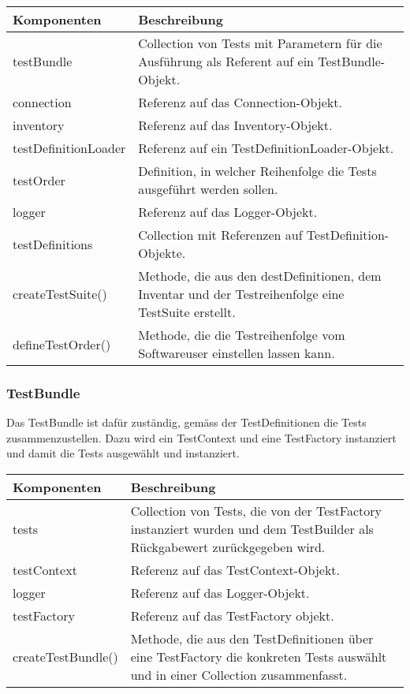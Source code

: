 \documentclass[
	ngerman,
	toc=listof, %
	toc=bibliography, %
	footnotes=multiple, %
	parskip=half, %
	numbers=noendperiod %
]{scrartcl}
\begin{document}
	\begin{tabularx}{\textwidth}{lX}
		\toprule
			Komponenten & Beschreibung \\
		\midrule
			testBundle & Collection von Tests mit Parametern für die Ausführung als Referent auf ein TestBundle-Objekt. \\
			connection & Referenz auf das Connection-Objekt. \\
			inventory & Referenz auf das Inventory-Objekt. \\
			testDefinitionLoader & Referenz auf ein TestDefinitionLoader-Objekt.\\
			testOrder & Definition, in welcher Reihenfolge die Tests ausgeführt werden sollen. \\
			logger & Referenz auf das Logger-Objekt.  \\
			testDefinitions & Collection mit Referenzen auf TestDefinition-Objekte. \\
		\midrule
			createTestSuite() & Methode, die aus den destDefinitionen, dem Inventar und der Testreihenfolge eine TestSuite erstellt. \\
			defineTestOrder() & Methode, die die Testreihenfolge vom Softwareuser einstellen lassen kann. \\
		\bottomrule
	\end{tabularx}
	\newpage

	\subsubsection{TestBundle}
	Das TestBundle ist dafür zuständig, gemäss der TestDefinitionen die Tests zusammenzustellen. 
	Dazu wird ein TestContext und eine TestFactory instanziert und damit die Tests ausgewählt und instanziert.

	\begin{tabularx}{\textwidth}{lX}
		\toprule
			Komponenten & Beschreibung \\
		\midrule
			tests & Collection von Tests, die von der TestFactory instanziert wurden und dem TestBuilder als Rückgabewert zurückgegeben wird. \\
			testContext & Referenz auf das TestContext-Objekt. \\
			logger & Referenz auf das Logger-Objekt. \\
			testFactory & Referenz auf das TestFactory objekt. \\
		\midrule
			createTestBundle() & Methode, die aus den TestDefinitionen über eine TestFactory die konkreten Tests auswählt und in einer Collection zusammenfasst. \\
		\bottomrule
	\end{tabularx}
\end{document}
